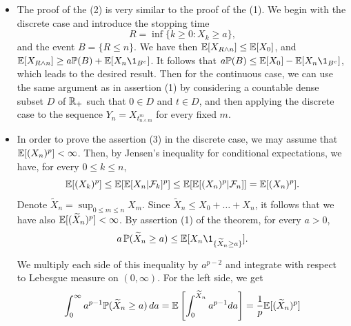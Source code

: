 \documentclass[../Main.tex]{subfiles}
\begin{document}
{\begin{itemize}
    Then, we observe that

    \[P\left( \sup_{s \in D_m} |X_s| > \lambda \right) \uparrow\PP\left( \sup_{s \in D \cap [0,t]} |X_s| > \lambda \right) \]
    when $m \uparrow \infty$. We have thus
    \[ \lambda\PP\left( \sup_{s \in D \cap [0,t]} |X_s| > \lambda \right) \leq  \EE[X_t^+]. \]
    Finally, the right-continuity of sample paths (and the fact that $t \in D$) ensures that
    \[ \sup_{s \in D \cap [0,t]} |X_s| = \sup_{s \in [0,t]} |X_s|. \]

    \item The proof of the (2) is very similar to the proof of the (1). We begin with the discrete case and introduce the stopping time 
    \[ R = \inf\{k \geq 0 : X_k \geq a\},\]
    and the event $B = \{R \leq n\}$. We have then $\mathbb{E}[X_{R \wedge n}] \leq \mathbb{E}[X_0]$, and $\EE[X_{R \wedge n}] \geq a \PP(B) + \EE[X_n \1_{B^c}]$. It follows that $a \PP(B) \leq \EE[X_0] - \EE[X_n \1_{B^c}]$, which leads to the desired result. Then for the continuous case, we can use the same argument as in assertion (1) by considering a countable dense subset $D$ of $\mathbb{R}_+$ such that $0 \in D$ and $t \in D$, and then applying the discrete case to the sequence $Y_n = X_{t^m_{n \wedge m}}$ for every fixed $m$. 

    \item In order to prove the assertion (3) in the discrete case, we may assume that $\mathbb{E}[(X_n)^p] < \infty$. Then, by Jensen's inequality for conditional expectations, we have, for every $0 \leq k \leq n$,
    \[ \mathbb{E}[(X_k)^p] \leq \mathbb{E}[\mathbb{E}[X_n | \mathcal{F}_k]^p] \leq \mathbb{E}[\mathbb{E}[(X_n)^p | \mathcal{F}_n]] = \mathbb{E}[(X_n)^p]. \]
    Denote $\widetilde{X}_n= \sup_{0 \leq m \leq n} X_m$. Since $\widetilde{X}_n \leq X_0 + \dots + X_n$, it follows that we have also $\mathbb{E}[(\widetilde{X}_n)^p] < \infty$. By assertion (1) of the theorem, for every $a > 0$,
    \[ a \, \PP(\widetilde{X}_n \geq a) \leq \EE[X_n \1_{\{\widetilde{X}_n \geq a\}}]. \]

    We multiply each side of this inequality by $a^{p-2}$ and integrate with respect to Lebesgue measure on $(0, \infty)$. For the left side, we get
    \[ \int_{0}^{\infty} a^{p-1} \mathbb{P}(\widetilde{X}_n \geq a) \, da = \mathbb{E} \left[ \int_{0}^{\widetilde{X}_n} a^{p-1} da \right] = \frac{1}{p} \mathbb{E}[(\widetilde{X}_n)^p] \]


\end{itemize}}
\end{document}
